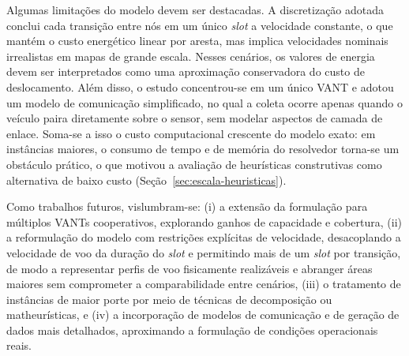 Algumas limitações do modelo devem ser destacadas. A discretização adotada conclui cada transição entre nós em um único \textit{slot} a velocidade constante, o que mantém o custo energético linear por aresta, mas implica velocidades nominais irrealistas em mapas de grande escala. Nesses cenários, os valores de energia devem ser interpretados como uma aproximação conservadora do custo de deslocamento. Além disso, o estudo concentrou-se em um único VANT e adotou um modelo de comunicação simplificado, no qual a coleta ocorre apenas quando o veículo paira diretamente sobre o sensor, sem modelar aspectos de camada de enlace. Soma-se a isso o custo computacional crescente do modelo exato: em instâncias maiores, o consumo de tempo e de memória do resolvedor torna-se um obstáculo prático, o que motivou a avaliação de heurísticas construtivas como alternativa de baixo custo (Seção~\ref{sec:escala-heuristicas}).

Como trabalhos futuros, vislumbram-se: (i) a extensão da formulação para múltiplos VANTs cooperativos, explorando ganhos de capacidade e cobertura, (ii) a reformulação do modelo com restrições explícitas de velocidade, desacoplando a velocidade de voo da duração do \textit{slot} e permitindo mais de um \textit{slot} por transição, de modo a representar perfis de voo fisicamente realizáveis e abranger áreas maiores sem comprometer a comparabilidade entre cenários, (iii) o tratamento de instâncias de maior porte por meio de técnicas de decomposição ou matheurísticas, e (iv) a incorporação de modelos de comunicação e de geração de dados mais detalhados, aproximando a formulação de condições operacionais reais.
